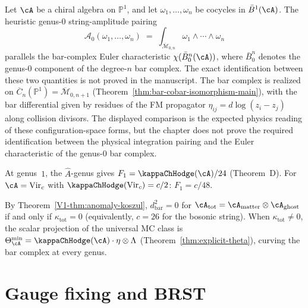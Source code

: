 \label{subsec:bv-bar-identification}

\begin{remark}\label{rem:genus0-amplitude-bar}
Let $\cA$ be a chiral algebra on $\mathbb{P}^1$, and let
$\omega_1, \ldots, \omega_n$ be cocycles in
$\bar{B}^1(\cA)$. The heuristic genus-$0$ string-amplitude pairing
\[
\mathcal{A}_0(\omega_1, \ldots, \omega_n)
\;=\;
\int_{\overline{\mathcal{M}}_{0,n}}
 \omega_1 \wedge \cdots \wedge \omega_n
\]
parallels the bar-complex Euler characteristic
$\chi(\bar{B}^n_0(\cA))$, where $\bar{B}^n_0$ denotes the
genus-$0$ component of the degree-$n$ bar complex. The exact
identification between these two quantities is not proved in the
manuscript.
The bar complex is realized on
$\overline{C}_n(\mathbb{P}^1) = \overline{\mathcal{M}}_{0,n+1}$
(Theorem~\ref{thm:bar-cobar-isomorphism-main}),
with the bar differential given by residues of the FM propagator
$\eta_{ij} = d\log(z_i - z_j)$ along collision divisors.
The displayed comparison is the expected physics reading of these
configuration-space forms, but the chapter does not prove the required
identification between the physical integration pairing and the Euler
characteristic of the genus-$0$ bar complex.
\end{remark}

\begin{remark}\label{rem:genus1-bv}
At genus~$1$, the $\hat{A}$-genus gives $F_1 = \kappaChHodge(\cA)/24$
\textup{(}Theorem~D\textup{)}. For $\cA = \mathrm{Vir}_c$ with
$\kappaChHodge(\mathrm{Vir}_c) = c/2$: $F_1 = c/48$.
\end{remark}

\begin{remark}[Anomaly = curvature]\label{rem:anomaly-curvature-bv}
By Theorem~\ref{V1-thm:anomaly-koszul}, $d_{\mathrm{bar}}^2 = 0$ for $\cA_{\mathrm{tot}} = \cA_{\mathrm{matter}} \otimes \cA_{\mathrm{ghost}}$ if and only if $\kappa_{\mathrm{tot}} = 0$ (equivalently, $c = 26$ for the bosonic string). When $\kappa_{\mathrm{tot}} \neq 0$, the scalar projection of the universal MC class is $\Theta_\cA^{\min} = \kappaChHodge(\cA) \cdot \eta \otimes \Lambda$ (Theorem~\ref{thm:explicit-theta}), curving the bar complex at every genus.
\end{remark}

\section{Gauge fixing and BRST}

